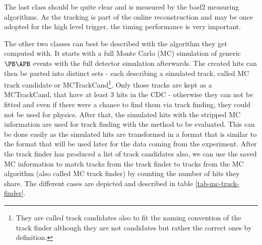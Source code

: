 The last class should be quite clear and is measured by the basf2 measuring algorithms. As the tracking is part of the online reconstruction and may be once adopted for the high level trigger, the timing performance is very important. 

The other two classes can best be described with the algorithm they get computed with. It starts with a full Monte Carlo (MC) simulation of generic $\PB\APB$ events with the full detector simulation afterwards. The created hits can then be parted into distinct sets - each describing a simulated track, called MC track candidate or MCTrackCand\footnote{They are called track candidates also to fit the naming convention of the track finder although they are not candidates but rather the correct ones by definition.}. Only those tracks are kept as a MCTrackCand, that have at least 3 hits in the CDC - otherwise they can not be fitted and even if there were a chance to find them via track finding, they could not be used for physics. After that, the simulated hits with the stripped MC information are used for track finding with the method to be evaluated. This can be done easily as the simulated hits are transformed in a format that is similar to the format that will be used later for the data coming from the experiment. After the track finder has produced a list of track candidates also, we can use the saved MC information to match tracks from the track finder to tracks from the MC algorithm (also called MC track finder) by counting the number of hits they share. The different cases are depicted and described in table \ref{tab-mc-track-finder}.

